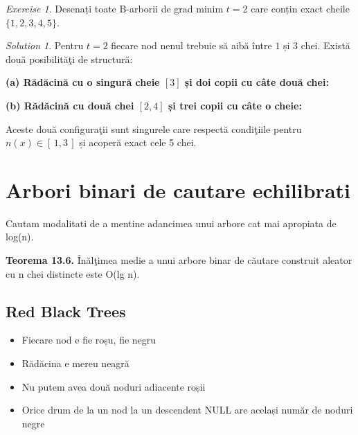 \documentclass[11pt,a4paper]{article}
\theoremstyle{definition}
\theoremstyle{plain}
\theoremstyle{remark}
\newtheorem{exercise}{Exercise}[section]
\newtheorem*{solution}{Solution}
\begin{document}
\begin{exercise}
Desenați toate B-arborii de grad minim \(t=2\) care conțin exact cheile \(\{1,2,3,4,5\}\).
\end{exercise}
\begin{solution}
Pentru \(t=2\) fiecare nod nenul trebuie să aibă între \(1\) și \(3\) chei. Există două posibilităţi de structură:

\medskip
\noindent\textbf{(a) Rădăcină cu o singură cheie \([3]\) și doi copii cu câte două chei:}
\begin{center}
\end{center}

\medskip
\noindent\textbf{(b) Rădăcină cu două chei \([2,4]\) și trei copii cu câte o cheie:}
\begin{center}
\end{center}

Aceste două configuraţii sunt singurele care respectă condiţiile pentru \(n(x)\in[\,1,3\,]\) și acoperă exact cele 5 chei.
\end{solution}



\section{Arbori binari de cautare echilibrati}

Cautam modalitati de a mentine adancimea unui arbore cat mai apropiata de log(n).

\textbf{Teorema 13.6.} Înălţimea medie a unui arbore binar de căutare construit aleator cu n chei distincte este O(lg n).

\subsection{Red Black Trees}
\begin{itemize}
    \item Fiecare nod e ﬁe roșu, ﬁe negru
    \item Rădăcina e mereu neagră
    \item Nu putem avea două noduri adiacente roșii
    \item Orice drum de la un nod la un descendent NULL are același număr de noduri negre
\end{itemize}
\end{document}
